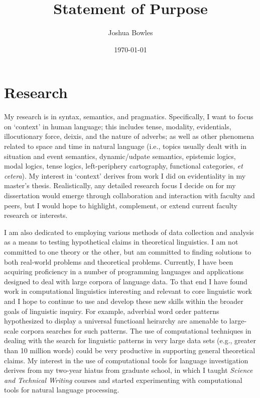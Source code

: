 \documentclass{article}
\begin{document}
\title{Statement of Purpose}
\author{Joshua Bowles}
\date{\today}

\maketitle

\section{Research}
My research is in syntax, semantics, and pragmatics. Specifically, I want to focus on `context' in human language; this includes tense, modality, evidentials, illocutionary force, deixis, and the nature of adverbs; as well as other phenomena related to space and time in natural language (i.e., topics usually dealt with in situation and event semantics, dynamic/udpate semantics, epistemic logics, modal logics, tense logics, left-periphery cartography, functional categories, {\sl et cetera}). My interest in `context' derives from work I did on evidentiality in my master's thesis. %
Realistically, any detailed research focus I decide on for my dissertation would emerge through collaboration and interaction with faculty and peers, but I would hope to highlight, complement, or extend current faculty research or interests. 

I  am also dedicated to employing various methods of data collection and analysis as a means to testing hypothetical claims in theoretical linguistics. I am not committed to one theory or the other, but am committed to finding solutions to both real-world problems and theoretical problems. Currently, I have been acquiring proficiency in a number of programming languages and applications designed to deal with large corpora of language data. To that end I have found work in computational linguistics interesting and relevant to core linguistic work and I hope to continue to use and develop these new skills within the broader goals of linguistic inquiry. For example, adverbial word order patterns hypothesized to display a universal functioanl heirarchy are amenable to large-scale corpora searches for such patterns. The use of computational techniques in dealing with the search for linguistic patterns in very large data sets (e.g., greater than 10 million words) could be very productive in supporting general theoretical claims. 
My interest in the use of computational tools for language investigation derives from my two-year hiatus from graduate school, in which I taught {\sl Science and Technical Writing} courses and started experimenting with computational tools for natural language processing.
\end{document}
